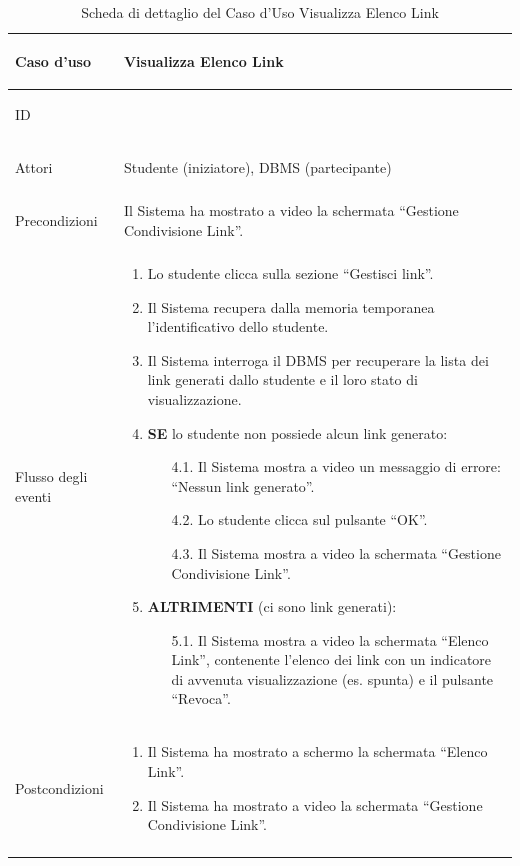 \documentclass[12pt,a4paper]{article}
\begin{document}
\footnotesize
\begin{longtable}{|
>{\columncolor{unipablue}\color{white}\bfseries\raggedright\arraybackslash}p{3.4cm}|
>{\raggedright\arraybackslash}p{11.1cm}|}
\hline
Caso d’uso & Visualizza Elenco Link \\ \hline
ID & 4.3 \\ \hline
Attori & Studente (iniziatore), DBMS (partecipante) \\ \hline
Precondizioni & Il Sistema ha mostrato a video la schermata ``Gestione Condivisione Link''. \\ \hline
Flusso degli eventi &
\begin{enumerate}[topsep=0.2em,itemsep=0.15em,parsep=0pt,partopsep=0pt]
    \item Lo studente clicca sulla sezione ``Gestisci link''.
    \item Il Sistema recupera dalla memoria temporanea l'identificativo dello studente.
    \item Il Sistema interroga il DBMS per recuperare la lista dei link generati dallo studente e il loro stato di visualizzazione.
    \item \textbf{SE} lo studente non possiede alcun link generato:
    \begin{itemize}[topsep=0.15em,itemsep=0.1em,parsep=0pt,partopsep=0pt]
        \item[4.1.] Il Sistema mostra a video un messaggio di errore: ``Nessun link generato''.
        \item[4.2.] Lo studente clicca sul pulsante ``OK''.
        \item[4.3.] Il Sistema mostra a video la schermata ``Gestione Condivisione Link''.
    \end{itemize}
    \item \textbf{ALTRIMENTI} (ci sono link generati):
    \begin{itemize}[topsep=0.15em,itemsep=0.1em,parsep=0pt,partopsep=0pt]
        \item[5.1.] Il Sistema mostra a video la schermata ``Elenco Link'', contenente l'elenco dei link con un indicatore di avvenuta visualizzazione (es. spunta) e il pulsante ``Revoca''.
    \end{itemize}
\end{enumerate} \\ \hline
Postcondizioni &
\begin{enumerate}[topsep=0.2em,itemsep=0.15em,parsep=0pt,partopsep=0pt]
    \item Il Sistema ha mostrato a schermo la schermata ``Elenco Link''.
    \item Il Sistema ha mostrato a video la schermata ``Gestione Condivisione Link''.
\end{enumerate} \\ \hline
\caption{Scheda di dettaglio del Caso d'Uso Visualizza Elenco Link}
\label{tab:uc_visualizza_elenco_link}\\
\end{longtable}
\normalsize
\end{document}
